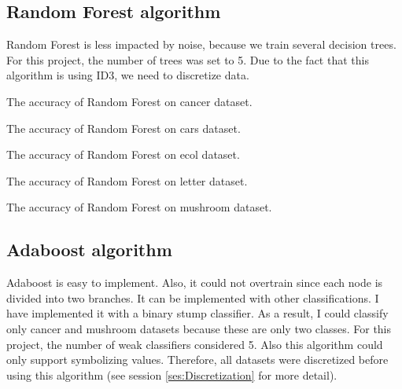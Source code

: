 \subsection{Random Forest algorithm}
Random Forest is less impacted by noise, because we train several decision trees. For this project, the number of trees was set to 5. Due to the fact that this algorithm is using ID3, we need to discretize data. 

\begin{table}[H]
\centering
\caption{The accuracy of Random Forest on cancer dataset.}
\label{tab:tab_rf_cancer}

\end{table}


\begin{table}[H]
\centering
\caption{The accuracy of Random Forest on cars dataset.}
\label{tab:tab_rf_cars}

\end{table}

\begin{table}[H]
\centering
\caption{The accuracy of Random Forest on ecol dataset.}
\label{tab:tab_rf_ecol}

\end{table}

\begin{table}[H]
\centering
\caption{The accuracy of Random Forest on letter dataset.}
\label{tab:tab_rf_letter}

\end{table}


\begin{table}[H]
\centering
\caption{The accuracy of Random Forest on mushroom dataset.}
\label{tab:tab_rf_mushroom}

\end{table}







\subsection{Adaboost algorithm}
Adaboost is easy to implement. Also, it could not overtrain since each node is divided into two branches. It can be implemented with other classifications. I have implemented it with a binary stump classifier. As a result, I could classify only cancer and mushroom datasets because these are only two classes. For this project, the number of weak classifiers considered 5. Also this algorithm could only support symbolizing values. Therefore, all datasets were discretized before using this algorithm (see session \ref{ses:Discretization} for more detail). 





